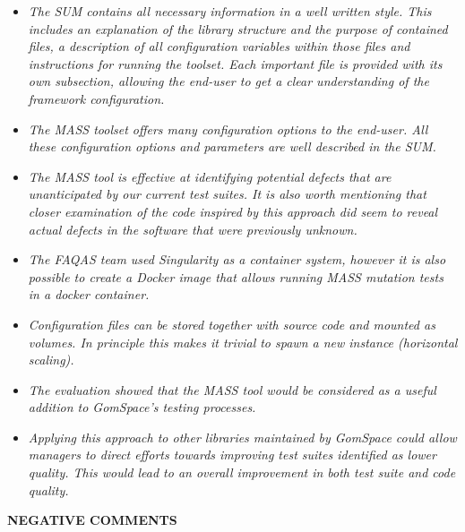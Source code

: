 \begin{itemize}

  \item \emph{The SUM contains all necessary information in a well written style. This includes an explanation of the library structure and the purpose of contained files, a description of all configuration variables within those files and instructions for running the toolset. Each important file is provided with its own subsection, allowing the end-user to get a clear understanding of the framework configuration.}

  \item \emph{The MASS toolset offers many configuration options to the end-user. All these configuration options and parameters are well described in the SUM. }

  \item \emph{The MASS tool is effective at identifying potential defects that are unanticipated by our current test suites. It is also worth mentioning that closer examination of the code inspired by this approach did seem to reveal actual defects in the software that were previously unknown.}

  \item \emph{The FAQAS team used Singularity as a container system, however it is also possible to create a Docker image that allows running MASS mutation tests in a docker container.}

  \item \emph{Configuration files can be stored together with source code and mounted as volumes. In principle this makes it trivial to spawn a new instance (horizontal scaling).}

  \item \emph{The evaluation showed that the MASS tool would be considered as a useful addition to GomSpace’s testing processes.}

  \item \emph{Applying this approach to other libraries maintained by GomSpace could allow managers to direct efforts towards improving test suites identified as lower quality. This would lead to an overall improvement in both test suite and code quality.}

\end{itemize}

\textbf{NEGATIVE COMMENTS}

